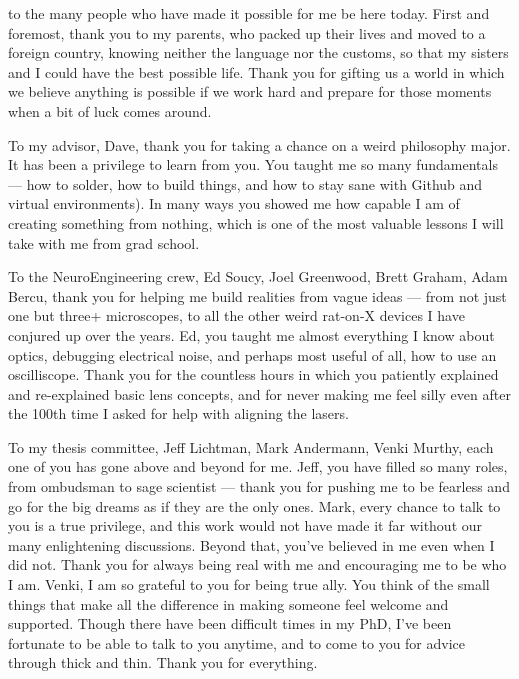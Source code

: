 
 to the many people who have made it possible for me be here today. First and foremost, thank you to my parents, who packed up their lives and moved to a foreign country, knowing neither the language nor the customs, so that my sisters and I could have the best possible life. Thank you for gifting us a world in which we believe anything is possible if we work hard and prepare for those moments when a bit of luck comes around. 

To my advisor, Dave, thank you for taking a chance on a weird philosophy major. It has been a privilege to learn from you. You taught me so many fundamentals — how to solder, how to build things, and how to stay sane with Github and virtual environments). In many ways you showed me how capable I am of creating something from nothing, which is one of the most valuable lessons I will take with me from grad school. 

To the NeuroEngineering crew, Ed Soucy, Joel Greenwood, Brett Graham, Adam Bercu, thank you for helping me build realities from  vague ideas --- from not just one but three+ microscopes, to all the other weird rat-on-X devices I have conjured up over the years. Ed, you taught me almost everything I know about optics, debugging electrical noise, and perhaps most useful of all, how to use an oscilliscope. Thank you for the countless hours in which you patiently explained and re-explained basic lens concepts, and for never making me feel silly even after the 100th time I asked for help with aligning the lasers. 

To my thesis committee, Jeff Lichtman, Mark Andermann, Venki Murthy, each one of you has gone above and beyond for me. Jeff, you have filled so many roles, from ombudsman to sage scientist — thank you for pushing me to be fearless and go for the big dreams as if they are the only ones. Mark, every chance to talk to you is a true privilege, and this work would not have made it far without our many enlightening discussions. Beyond that, you’ve believed in me even when I did not. Thank you for always being real with me and encouraging me to be who I am. Venki, I am so grateful to you for being true ally. You think of the small things that make all the difference in making someone feel welcome and supported. Though there have been difficult times in my PhD, I’ve been fortunate to be able to talk to you anytime, and to come to you for advice through thick and thin. Thank you for everything.

